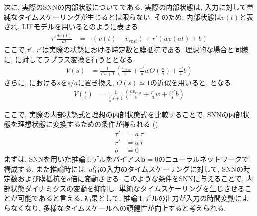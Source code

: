 次に, 実際のSNNの内部状態についてである.
実際の内部状態は, 入力に対して単純なタイムスケーリングが生じるとは限らない.
そのため, 内部状態は$v(t)$と表され, LIFモデルを用いるとのように表せる.
\begin{equation}
    \begin{split}
        \tau' \frac{dv(t)}{dt} &= -(v(t)-v_{rest}) + r'(w o(at) + b)
    \end{split}
    \label{sec2:eq:actual}
\end{equation}
ここで,$\tau',~r'$は実際の状態における時定数と膜抵抗である.
理想的な場合と同様に, に対してラプラス変換を行うととなる.
\begin{equation}
    \begin{split}
        V(s) &= \frac{1}{\tau' s+1}(\frac{v_{rest}}{s}+\frac{r'}{a} w O(\frac{s}{a})+\frac{r'}{s}b)
    \end{split}
    \label{sec2:eq:actual_laplace}
\end{equation}
さらに, における$s$を$s/a$に置き換え, $O(s)\simeq1$の近似を用いると, となる.
\begin{equation}
    \begin{split}
        V(\frac{s}{a}) &= \frac{1}{\frac{\tau'}{a} s+1}(\frac{av_{rest}}{s}+\frac{r'}{a} w+\frac{a r'}{s}b)
    \end{split}
    \label{sec2:eq:actual_laplace2}
\end{equation}

ここで, 実際の内部状態式と理想の内部状態式を比較することで, SNNの内部状態を理想状態に変換するための条件が得られる ().
\begin{equation}
    \begin{split}
        \tau'&=a ~\tau\\
        r'&=a~r \\
        b&=0
    \end{split}
    \label{sec2:eq:condition}
\end{equation}
まずは, SNNを用いた推論モデルをバイアス$\bm{b}=0$のニューラルネットワークで構成する.
また推論時には, $a$倍の入力のタイムスケーリングに対して, SNNの時定数および膜抵抗を$a$倍に変動させる.
このような条件をSNNに与えることで, 内部状態ダイナミクスの変動を抑制し, 単純なタイムスケーリングを生じさせることが可能であると言える.
結果として, 推論モデルの出力が入力の時間変動によらなくなり, 多様なタイムスケールへの頑健性が向上すると考えられる.
